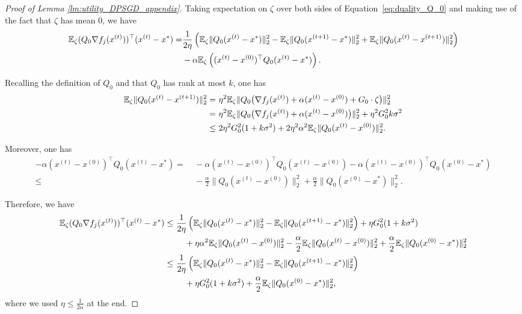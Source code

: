 \begin{proof}[Proof of Lemma \ref{lm:utility_DPSGD_appendix}]
Taking expectation on $\zeta$ over both sides of Equation~\eqref{eq:duality_Q_0} and making use of the fact that $\zeta$ has mean $0$, we have
\begin{align*}
\mathbb{E}_{\zeta}(Q_{0}\nabla f_{j}(x^{(t)}))^{\top}(x^{(t)}-x^{*}) = & \frac{1}{2\eta}
    \left(\mathbb{E}_{\zeta}\|Q_{0}(x^{(t)}-x^{*})\|_2^{2} - 
        \mathbb{E}_{\zeta}\|Q_{0}(x^{(t+1)}-x^{*})\|_2^{2} + 
        \mathbb{E}_{\zeta}\|Q_{0}(x^{(t)}-x^{(t+1)})\|_2^{2}\right)\\
 & -\alpha\mathbb{E}_{\zeta}\left( (x^{(t)}-x^{(0)})^{\top}Q_{0}(x^{(t)}-x^{*}) \right).
\end{align*}

Recalling the definition of $Q_0$ and that $Q_0$ has rank at most $k$, one has
\begin{align*}
\mathbb{E}_{\zeta}\|Q_{0}(x^{(t)}-x^{(t+1)})\|_2^{2} =
    &~ \eta^{2}\mathbb{E}_{\zeta}\|Q_{0}\big(\nabla f_{j}(x^{(t)})+\alpha(x^{(t)}-x^{(0)})+G_{0}\cdot\zeta\big)\|_2^{2}\\
    = &~ \eta^{2}\mathbb{E}_{\zeta}\|Q_{0}\big(\nabla f_{j}(x^{(t)})+\alpha(x^{(t)}-x^{(0)})\big)\|_2^{2}+\eta^{2}G_{0}^{2}k\sigma^{2}\\
\leq &~
    2\eta^{2}G_{0}^{2}(1+k\sigma^{2}) + 
    2\eta^{2}\alpha^{2}\mathbb{E}_{\zeta}\|Q_{0}(x^{(t)}-x^{(0)})\|_2^{2}.
\end{align*}

Moreover, one has
\begin{align*}
-\alpha(x^{(t)}-x^{(0)})^{\top}Q_{0}(x^{(t)}-x^{*}) = &~ -\alpha(x^{(t)}-x^{(0)})^{\top}Q_{0}(x^{(t)}-x^{(0)})-\alpha(x^{(t)}-x^{(0)})^{\top}Q_{0}(x^{(0)}-x^{*})\\
\leq &~
    -\frac{\alpha}{2}\|Q_{0}(x^{(t)}-x^{(0)})\|_2^{2} + 
    \frac{\alpha}{2}\|Q_{0}(x^{(0)}-x^{*})\|_2^{2}.
\end{align*}

Therefore, we have
\begin{align}
\mathbb{E}_{\zeta}(Q_{0}\nabla f_{j}(x^{(t)}))^{\top}(x^{(t)}-x^{*}) \leq & ~ \frac{1}{2\eta}
        \left(\mathbb{E}_{\zeta}\|Q_{0}(x^{(t)}-x^{*})\|_2^{2} - 
           \mathbb{E}_{\zeta}\|Q_{0}(x^{(t+1)}-x^{*})\|_2^{2}
        \right) + \eta G_0^2(1+k\sigma^2) \nonumber\\ 
     &~~~~ +\eta \alpha^2\mathbb{E}_{\zeta}\| Q_0(x^{(t)}-x^{(0)})\|_2^2 - 
                \frac{\alpha}{2}\mathbb{E}_{\zeta}\|Q_{0}(x^{(t)}-x^{(0)})\|_2^{2} + 
                \frac{\alpha}{2}\mathbb{E}_{\zeta}\|Q_{0}(x^{(0)}-x^{*})\|_2^{2}  \nonumber \\
     \leq & ~ \frac{1}{2\eta} \left(\mathbb{E}_{\zeta}\|Q_{0}(x^{(t)}-x^{*})\|_2^{2} - 
                \mathbb{E}_{\zeta}\|Q_{0}(x^{(t+1)}-x^{*})\|_2^{2}  \right)  \\
                &~~~~+\eta G_0^2(1+k\sigma^2)+\frac{\alpha}{2}\mathbb{E}_{\zeta}\|Q_0(x^{(0)}-x^*)\|_2^2 \label{eq:term1},
\end{align}
where we used $\eta\leq\frac{1}{2\alpha}$ at the end. 
\medskip


\end{proof}
